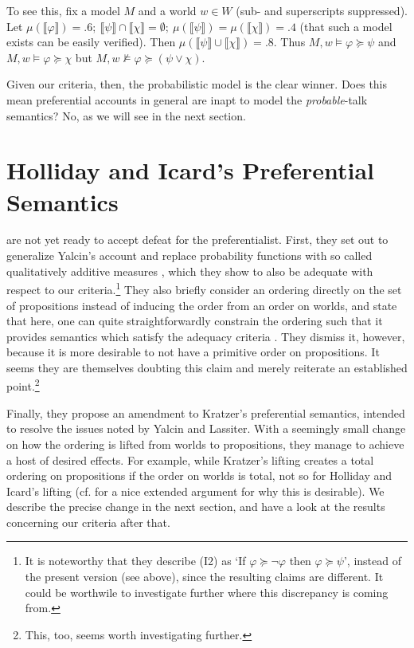 \documentclass{article}
\theoremstyle{definition}
\newcommand{\lb}{\llbracket}
\newcommand{\rb}{\rrbracket}
\begin{document}
\noindent To see this, fix a model $M$ and a world $w \in W$ (sub- and superscripts suppressed).
Let $\mu(\lb\varphi\rb) = .6;~ \lb\psi\rb \cap \lb\chi\rb=\emptyset;~ \mu(\lb\psi\rb) = \mu(\lb\chi\rb) = .4$ (that such a model exists can be easily verified).
Then $\mu(\lb \psi \rb \cup \lb \chi \rb) = .8$.
Thus $M,w \models \varphi \succeq \psi$ and $ M,w \models \varphi \succeq \chi$ but $M,w \not\models \varphi \succeq (\psi \lor \chi)$.

Given our criteria, then, the probabilistic model is the clear winner.
Does this
mean preferential accounts in general are inapt to model the
\emph{probable}-talk semantics?
No, as we will see in the next section.

\section{Holliday and Icard's Preferential Semantics}

\textcite{holliday13_measur} are not yet ready to accept defeat for the preferentialist. First, they set out to generalize Yalcin's account and replace probability functions with so called qualitatively additive measures \parencite[][p.~522]{holliday13_measur}, which they show to also be adequate with respect to our criteria.\footnote{It is noteworthy that they describe (I2) as `If $\varphi \succeq \neg \varphi$ then $\varphi \succeq \psi$', instead of the present version (see above), since the resulting claims are different. It could be worthwile to investigate further where this discrepancy is coming from.}
They also briefly consider an ordering directly on the set of propositions instead of inducing the order from an order on worlds, and state that here, one can quite straightforwardly constrain the ordering such that it provides semantics which satisfy the adequacy criteria \parencite[p.~924]{holliday13_measur}.
They dismiss it, however, because it is more desirable to not have a primitive order on propositions.
It seems they are themselves doubting this claim and merely reiterate an established point.\footnote{This, too, seems worth investigating further.}

Finally, they propose an amendment to Kratzer's preferential semantics, intended to resolve the issues noted by Yalcin and Lassiter. With a seemingly small change on how the ordering is lifted from worlds to propositions, they manage to achieve a host of desired effects. For example, while Kratzer's lifting creates a total ordering on propositions if the order on worlds is total, not so for Holliday and Icard's lifting (cf. \textcite[][p.~525]{holliday13_measur} for a nice extended argument for why this is desirable). We describe the precise change in the next section, and have a look at the results concerning our criteria after that.
\end{document}
